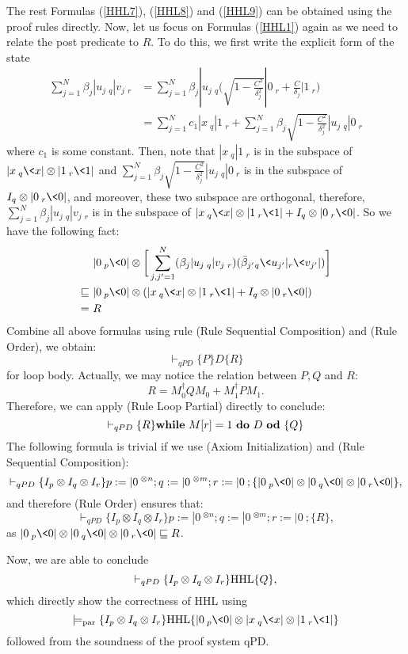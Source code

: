 The rest Formulas (\ref{HHL7}), (\ref{HHL8}) and (\ref{HHL9}) can be obtained using the proof rules directly.
Now, let us focus on Formulas (\ref{HHL1}) again as we need to relate the post predicate to $R$. To do this, we first write the explicit form of the state
\begin{align*}
\sum_{j = 1}^N\beta_j|u_j\>_q|v_j\>_r &= \sum_{j = 1}^N\beta_j|u_j\>_q\bigg(\sqrt{1-\frac{C^2}{\delta_j^2}}|0\>_r + \frac{C}{\delta_j}|1\>_r\bigg) \\
&= \sum_{j = 1}^Nc_1 |x\>_q|1\>_r + \sum_{j = 1}^N\beta_j\sqrt{1-\frac{C^2}{\delta_j^2}}|u_j\>_q|0\>_r
\end{align*}
where $c_1$ is some constant. Then, note that $|x\>_q|1\>_r$ is in the subspace of $|x\>_q\<x|\otimes|1\>_r\<1|$ and $\sum_{j = 1}^N\beta_j\sqrt{1-\frac{C^2}{\delta_j^2}}|u_j\>_q|0\>_r$ is in the subspace of
$I_q\otimes |0\>_r\<0|$, and moreover, these two subspace are orthogonal, therefore, $\sum_{j = 1}^N\beta_j|u_j\>_q|v_j\>_r$ is in the subspace of $|x\>_q\<x|\otimes|1\>_r\<1| + I_q\otimes |0\>_r\<0|$. So we have the following fact:
\begin{align}
&|0\>_p\<0|\otimes\bigg[\sum_{j,j^\prime = 1}^N(\beta_j|u_j\>_q|v_j\>_r)
(\bar{\beta}_{j^\prime}{}_q\<u_{j^\prime}|_r\<v_{j^\prime}|)\bigg] \notag\\
\sqsubseteq\ &
|0\>_p\<0|\otimes(|x\>_q\<x|\otimes|1\>_r\<1| + I_q\otimes |0\>_r\<0|) \notag\\
=\ & R \label{RR}
\end{align}
Combine all above formulas using rule (Rule Sequential Composition) and (Rule Order), we obtain:
$$
\vdash_{qPD} \{P\}D\{R\}
$$
for loop body. Actually, we may notice the relation between $P,Q$ and $R$:
$$R = M_0^\dag Q M_0 + M_1^\dag P M_1.$$
Therefore, we can apply (Rule Loop Partial) directly to conclude:
$$
\vdash_{qPD} \{R\}{\rm\bf while\ }M[r] = 1 {\ \rm\bf do\ } D {\ \rm\bf od\ }\{Q\}
$$
The following formula is trivial if we use (Axiom Initialization) and (Rule Sequential Composition):
$$
\vdash_{qPD} \{I_p\otimes I_q\otimes I_r\}p := |0\>^{\otimes n};
q := |0\>^{\otimes m};
r := |0\>;\{|0\>_p\<0|\otimes |0\>_q\<0|\otimes|0\>_r\<0|\},
$$
and therefore (Rule Order) ensures that:
$$
\vdash_{qPD} \{I_p\otimes I_q\otimes I_r\}p := |0\>^{\otimes n};
q := |0\>^{\otimes m};
r := |0\>;\{R\},
$$
as $|0\>_p\<0|\otimes |0\>_q\<0|\otimes|0\>_r\<0|\sqsubseteq R$.

Now, we are able to conclude
$$
\vdash_{qPD}\{I_p\otimes I_q\otimes I_r\}{\rm HHL}\{Q\},
$$
which directly show the correctness of HHL using
$$
\models_{\rm par}\{I_p\otimes I_q\otimes I_r\}{\rm HHL}\{|0\>_p\<0|\otimes |x\>_q\<x|\otimes|1\>_r\<1|\}
$$
followed from the soundness of the proof system qPD.


